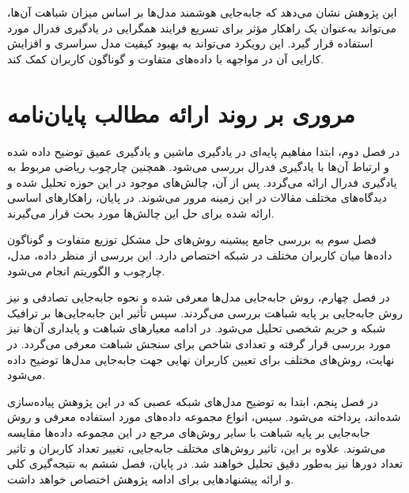 این پژوهش نشان می‌دهد که جابه‌جایی هوشمند مدل‌ها بر اساس میزان شباهت آن‌ها، می‌تواند به‌عنوان یک راهکار مؤثر برای تسریع فرایند همگرایی در یادگیری فدرال مورد استفاده قرار گیرد. این رویکرد می‌تواند به بهبود کیفیت مدل سراسری و افزایش کارایی آن در مواجهه با داده‌های متفاوت و گوناگون کاربران کمک کند.



\section{مروری بر روند ارائه مطالب پایان‌نامه}

در فصل دوم، ابتدا مفاهیم پایه‌ای در یادگیری ماشین و یادگیری عمیق توضیح داده شده و ارتباط آن‌ها با یادگیری فدرال بررسی می‌شود. همچنین چارچوب ریاضی مربوط به یادگیری فدرال ارائه می‌گردد. پس از آن، چالش‌های موجود در این حوزه تحلیل شده و دیدگاه‌های مختلف مقالات در این زمینه مرور می‌شوند. در پایان، راهکارهای اساسی ارائه شده برای حل این چالش‌ها مورد بحث قرار می‌گیرند.

فصل سوم به بررسی جامع پیشینه روش‌های حل مشکل توزیع متفاوت و گوناگون داده‌ها میان کاربران مختلف در شبکه اختصاص دارد. این بررسی از منظر داده، مدل، چارچوب و الگوریتم انجام می‌شود.

در فصل چهارم، روش جابه‌جایی مدل‌ها معرفی شده و نحوه جابه‌جایی تصادفی و نیز روش جابه‌جایی بر پایه شباهت بررسی می‌گردند. سپس تأثیر این جابه‌جایی‌ها بر ترافیک شبکه و حریم شخصی تحلیل می‌شود. در ادامه معیارهای شباهت و پایداری آن‌ها نیز مورد بررسی قرار گرفته و تعدادی شاخص برای سنجش شباهت معرفی می‌گردد. در نهایت، روش‌های مختلف برای تعیین کاربران نهایی جهت جابه‌جایی مدل‌ها توضیح داده می‌شود.

در فصل پنجم، ابتدا به توضیح مدل‌های شبکه عصبی که در این پژوهش پیاده‌سازی شده‌اند، پرداخته می‌شود. سپس، انواع مجموعه داده‌های مورد استفاده معرفی و روش جابه‌جایی بر پایه شباهت با سایر روش‌های مرجع در این مجموعه داده‌ها مقایسه می‌شوند. علاوه بر این، تاثیر روش‌های مختلف جابه‌جایی، تغییر تعداد کاربران و تاثیر تعداد دورها نیز به‌طور دقیق تحلیل خواهند شد.
در پایان، فصل ششم به نتیجه‌گیری کلی و ارائه پیشنهادهایی برای ادامه پژوهش اختصاص خواهد داشت.